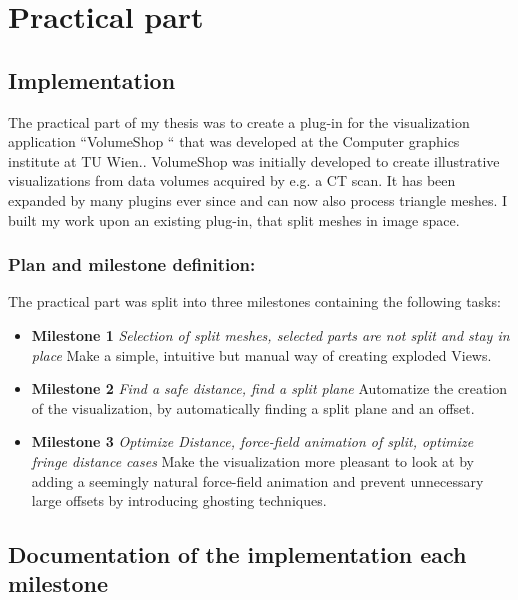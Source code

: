 \chapter{Practical part}
\section{Implementation}
The practical part of my thesis was to create a plug-in for the visualization application ``VolumeShop `` that was developed at the Computer graphics institute at TU Wien.\cite{bruckner-2005-VIS}. VolumeShop was initially developed to create illustrative visualizations from data volumes acquired by e.g. a CT scan. It has been expanded by many plugins ever since and can now also process triangle meshes. I built my work upon an existing plug-in\cite{schwankl-2013-smis}, that split meshes in image space.
\subsection{Plan and milestone definition:}
The practical part was split into three milestones containing the following tasks:
\begin{itemize}
\item \textbf{Milestone 1} \emph{Selection of split meshes, selected parts are not split and stay in place} Make a simple, intuitive but manual way of creating exploded Views.
\item \textbf{Milestone 2} \emph{Find a safe distance, find a split plane} Automatize the creation of the visualization, by automatically finding a split plane and an offset.
\item \textbf{Milestone 3} \emph{Optimize Distance, force-field animation of split, optimize fringe distance cases} Make the visualization more pleasant to look at by adding a seemingly natural force-field animation and prevent unnecessary large offsets by introducing ghosting techniques.
\end{itemize}

\section{Documentation of the implementation each milestone}
